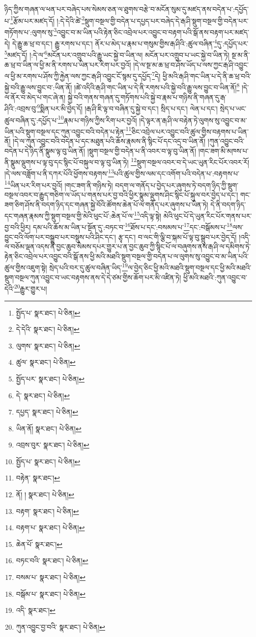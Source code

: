 ཉིད་ཀྱིས་གཞན་ལ་ཕན་པར་བཞེད་པས་སེམས་ཅན་ལ་ཐུགས་བརྩེ་བ་མངོན་སུམ་དུ་མཛད་ནས་བདེན་པ་:དཔྱོད་པ་\footnote{སྤྱོད་པ་  སྣར་ཐང་།  པེ་ཅིན། }རྩོམ་པར་མཛད་དོ། །:དེ་དེའི་ཚེ་\footnote{དེ་དེའི་  སྣར་ཐང་།  པེ་ཅིན། }སྡུག་བསྔལ་གྱི་བདེན་པ་དཔྱད་པར་བཞེད་དེ་རྒ་ཤི་སྡུག་བསྔལ་གྱི་བདེན་པར་གཏོགས་པ་:ལུགས་སུ་\footnote{ལུགས་  སྣར་ཐང་།  པེ་ཅིན། }འབྱུང་བ་མ་ཡིན་པའི་རྟེན་ཅིང་འབྲེལ་པར་འབྱུང་བ་བརྟག་པའི་སྒོ་ནས་བརྟག་པར་མཛད་དེ། དེ་རྒྱུ་ཆ་ཕྲ་བ་དང་། རྒྱུ་རགས་པ་དང་། ནོར་པ་མེད་པ་རྣམ་པ་གསུམ་གྱིས་རྒ་ཤིའི་:ཚུལ་བཞིན་\footnote{ཚུལ་  སྣར་ཐང་།  པེ་ཅིན། }དུ་:དཔྱོད་པར་\footnote{སྤྱོད་པར་  སྣར་ཐང་།  པེ་ཅིན། }མཛད་དོ། །:དེ་ལ་\footnote{དེ་  སྣར་ཐང་།  པེ་ཅིན། }མངོན་པར་འགྲུབ་པའི་རྒྱུ་ཡང་སྐྱེ་བ་ཡིན་ལ། མངོན་པར་འགྲུབ་པ་ཡང་སྐྱེ་བ་ཡིན་ཏེ། སྔ་མ་ནི་ཆ་ཕྲ་བ་ཡིན་ལ་ཕྱི་མ་ནི་རགས་པ་ཡིན་པར་རིག་པར་བྱའོ། །དེ་ལ་སྔ་མ་ཆ་ཕྲ་བ་ཤོས་ཡོད་པ་ལས་ཀྱང་རྒ་ཤི་འབྱུང་ལ་ཕྱི་མ་རགས་པ་ཤོས་ཀྱི་རྐྱེན་ལས་ཀྱང་རྒ་ཤི་འབྱུང་ངོ་སྙམ་དུ་དཔྱོད་\footnote{དཔྱད་  སྣར་ཐང་།  པེ་ཅིན། }དེ། ཕྱི་མའི་རྒ་ཤི་གང་ཡིན་པ་དེ་ནི་ཆ་ཕྲ་བའི་སྐྱེ་བའི་རྒྱུ་ལས་བྱུང་བ་:ཡིན་ནོ། །ཚེ་འདིའི་རྒ་ཤི་གང་ཡིན་པ་དེ་ནི་རགས་པའི་སྐྱེ་བའི་རྒྱུ་ལས་བྱུང་བ་ཡིན་ནོ།\footnote{ཡིན་ནོ།  སྣར་ཐང་།  པེ་ཅིན། } །དེ་ལ་ནོར་བ་མེད་པ་གང་ཞེ་ན། སྐྱེ་བའི་གནས་གཞན་དུ་གཏོགས་པའི་སྐྱེ་བ་རྣམ་པ་གཉིས་ནི་གཞན་དུ་རྒ་ཤིའི་:འབྲས་བུ་\footnote{འབྲས་བུར་  སྣར་ཐང་།  པེ་ཅིན། }སྨིན་པར་མི་བྱེད་དོ། །རྒ་ཤི་ཇི་ལྟ་བ་བཞིན་དུ་སྐྱེ་བ་དང་། སྲིད་པ་དང་། ལེན་པ་དང་། སྲེད་པ་ཡང་ཚུལ་བཞིན་དུ་:དཔྱོད་པ་\footnote{སྤྱོད་པ་  སྣར་ཐང་།  པེ་ཅིན། }རྣམ་པ་གཉིས་ཀྱིས་རིག་པར་བྱའོ། །དེ་ལྟར་ན་རྒ་ཤི་ལ་བརྟེན་ཏེ་ལུགས་སུ་འབྱུང་བ་མ་ཡིན་པའི་སྡུག་བསྔལ་དང་ཀུན་འབྱུང་བའི་བདེན་པ་རྟེན་\footnote{བརྟེན་  སྣར་ཐང་། }ཅིང་འབྲེལ་པར་འབྱུང་བའི་ཚུལ་གྱིས་བརྟགས་པ་ཡིན་ནོ། །དེ་ལ་ཀུན་འབྱུང་བའི་བདེན་པ་དང་མཐུན་པའི་ཆོས་རྣམས་ནི་སྙིང་པོ་དང་འདྲ་བ་ཡིན་ནོ། །ཀུན་འབྱུང་བའི་བདེན་པ་དེ་ཉིད་ནི་སྣུམ་ལྟ་བུ་ཡིན་ནོ། །སྡུག་བསྔལ་གྱི་བདེན་པ་ནི་འབར་བ་ལྟ་བུ་ཡིན་ནོ། །གང་ཟག་མི་མཁས་པ་ནི་སྣུམ་ལྡུགས་པ་ལྟ་བུ་དང་སྙིང་པོ་བསྐུལ་བ་ལྟ་བུ་ཡིན་ཏེ། \footnote{ནོ། །   སྣར་ཐང་།  པེ་ཅིན། }སྡུག་བསྔལ་འབར་བ་དེ་ཡང་ཡུན་རིང་པོར་འབར་རོ། །དེ་ལས་བཟློག་པ་ནི་དཀར་པོའི་ཕྱོགས་བརྟགས་\footnote{བརྟག་  སྣར་ཐང་།  པེ་ཅིན། }པའི་ཚུལ་གྱིས་ལམ་དང་འགོག་པའི་བདེན་པ་:བརྟགས་པ་\footnote{བརྟག་པ་  སྣར་ཐང་།  པེ་ཅིན། }ཡིན་པར་རིག་པར་བྱའོ། །གང་ཟག་ནི་གཉིས་ཏེ། བདག་ལ་གནོད་པ་བྱེད་པར་ཞུགས་ཏེ་བདག་ཉིད་ཀྱི་སྡུག་བསྔལ་འབར་བ་རྒྱུད་གཅིག་ལ་ཡོད་པ་གནས་པར་བྱ་བའི་ཕྱིར་སྣུམ་ལྡུགས་ཤིང་སྙིང་པོ་སྐུལ་བར་བྱེད་པ་དང་། གང་ཟག་ཅིག་ཤོས་ནི་བདག་ཉིད་དང་གཞན་སྐྱེ་བོའི་ཚོགས་ཆེན་པོ་ལ་གནོད་པར་ཞུགས་པ་ཡིན་ཏེ། དེ་ནི་བདག་ཉིད་དང་གཞན་རྣམས་ཀྱི་སྡུག་བསྔལ་གྱི་མེའི་ཕུང་པོ་:ཆེན་པོ་ལ་\footnote{ཆེན་པོ་  སྣར་ཐང་། }འདི་ལྟ་སྟེ། མེའི་ཕུང་པོ་དེ་ཡུན་རིང་པོར་གནས་པར་བྱ་བའི་ཕྱིར། དམ་པའི་ཆོས་མ་ཡིན་པ་སྔོན་དུ་:བཏང་བ་\footnote{བཏང་བའི་  སྣར་ཐང་།  པེ་ཅིན། }ཐོས་པ་དང་:བསམས་པ་\footnote{བསམ་པ་  སྣར་ཐང་།  པེ་ཅིན། }དང་:བསྒོམས་པ་\footnote{བསྒོམ་པ་  སྣར་ཐང་།  པེ་ཅིན། }ལས་བྱུང་བའི་ལོག་པར་བསྒྲུབ་པར་བསྡུས་པའི་ཤིང་དང་། རྩྭ་དང་། བ་ལང་གི་ལྕི་བ་སྐམ་པོ་ལྟ་བུ་སྒྲུབ་པར་བྱེད་དོ། །འདི་ལ་བཅོམ་ལྡན་འདས་ནི་བྱང་ཆུབ་སེམས་དཔར་གྱུར་པ་ན་བྱང་ཆུབ་ཀྱི་སྙིང་པོ་ལ་བཞུགས་ནས་རྒ་ཤི་ལ་དམིགས་ཏེ་རྟེན་ཅིང་འབྲེལ་པར་འབྱུང་བའི་སྒོ་ནས་ཕྱི་མའི་མཐའི་སྡུག་བསྔལ་གྱི་བདེན་པ་ལ་ལུགས་སུ་འབྱུང་བ་མ་ཡིན་པའི་ཚུལ་གྱིས་འཇུག་སྟེ། སྲེད་པའི་བར་དུ་ཚུལ་བཞིན་ཡིད་\footnote{འདི་  སྣར་ཐང་། }ལ་བྱེད་ཅིང་ཕྱི་མའི་མཐའི་སྡུག་བསྔལ་དང་ཕྱི་མའི་མཐའི་སྡུག་བསྔལ་ཀུན་འབྱུང་བ་ཡང་བརྟགས་ནས་དེ་དེ་ཙམ་གྱིས་ཆོག་པར་མི་འཛིན་ཏེ། ཕྱི་མའི་མཐའི་:ཀུན་འབྱུང་བ་དེའི་\footnote{ཀུན་འབྱུང་བྱ་བའི་  སྣར་ཐང་།  པེ་ཅིན། }རྒྱུར་གྱུར་པ། 